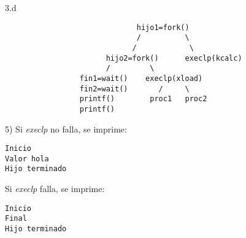 \documentclass{article}
\begin{document}
3.d
\begin{verbatim}
                              hijo1=fork()
                              /          \
                             /            \
                       hijo2=fork()      execlp(kcalc)
                       /         \
                 fin1=wait()    execlp(xload)
                 fin2=wait()       /     \
                 printf()        proc1   proc2
                 printf()
\end{verbatim}

5) Si \emph{execlp} no falla, se imprime:\\
\begin{verbatim}
Inicio
Valor hola
Hijo terminado
\end{verbatim}
 Si \emph{execlp} falla, se imprime:\\
\begin{verbatim}
Inicio
Final
Hijo terminado
\end{verbatim}
\end{document}
